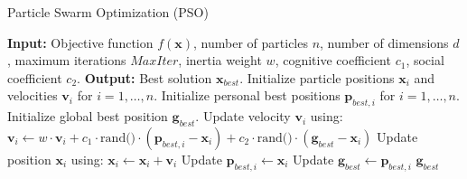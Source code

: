 \documentclass{article}
\begin{document}
	
	\begin{algorithm}
		\caption{Particle Swarm Optimization (PSO)}
		\begin{algorithmic}[1]
			\State \textbf{Input:} Objective function $f(\mathbf{x})$, number of particles $n$, number of dimensions $d$, maximum iterations $MaxIter$, inertia weight $w$, cognitive coefficient $c_1$, social coefficient $c_2$.
			\State \textbf{Output:} Best solution $\mathbf{x}_{best}$.
			\State Initialize particle positions $\mathbf{x}_i$ and velocities $\mathbf{v}_i$ for $i = 1, \ldots, n$.
			\State Initialize personal best positions $\mathbf{p}_{best,i}$ for $i = 1, \ldots, n$.
			\State Initialize global best position $\mathbf{g}_{best}$.
			\State Update velocity $\mathbf{v}_i$ using:
			\State $\mathbf{v}_i \gets w \cdot \mathbf{v}_i + c_1 \cdot \text{rand()} \cdot (\mathbf{p}_{best,i} - \mathbf{x}_i) + c_2 \cdot \text{rand()} \cdot (\mathbf{g}_{best} - \mathbf{x}_i)$
			\State Update position $\mathbf{x}_i$ using:
			\State $\mathbf{x}_i \gets \mathbf{x}_i + \mathbf{v}_i$
			\State Update $\mathbf{p}_{best,i} \gets \mathbf{x}_i$
			\EndIf
			\EndFor
			\State Update $\mathbf{g}_{best} \gets \mathbf{p}_{best,i}$
			\EndIf
			\EndFor
			\State \Return $\mathbf{g}_{best}$
		\end{algorithmic}
	\end{algorithm}
	
\end{document}
